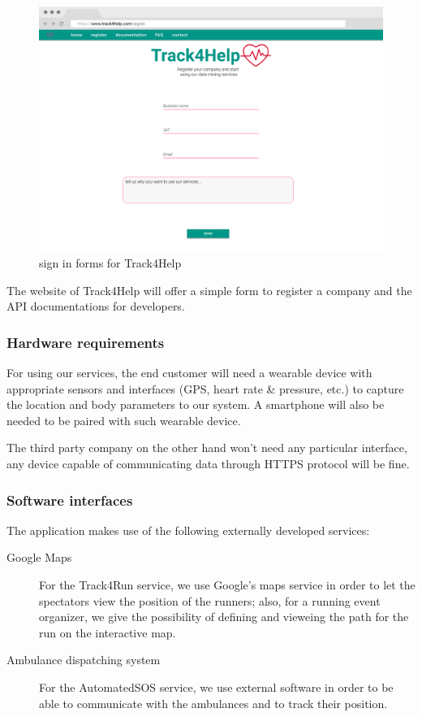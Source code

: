 \documentclass[../main.tex]{subfiles}
\begin{document}
\begin{figure}[H]
	\centering
	\includegraphics[scale=0.3]{images/mockup/webpage.png}
	\caption{sign in forms for Track4Help}
	\label{mockup_webpage}
\end{figure}
The website of Track4Help will offer a simple form to register a company and the API documentations for developers.

\subsubsection{Hardware requirements}

For using our services, the end customer will need a wearable device with appropriate sensors and interfaces (GPS, heart rate \& pressure, etc.) to capture the location and body parameters to our system. A smartphone will also be needed to be paired with such wearable device.

The third party company on the other hand won't need any particular interface, any device capable of communicating data through HTTPS protocol will be fine.

\subsubsection{Software interfaces}

The application makes use of the following externally developed services:

\begin{description}

	\item [Google Maps] For the Track4Run service, we use Google's maps service in order to let the spectators view the position of the runners; also, for a running event organizer, we give the possibility of defining and vieweing the path for the run on the interactive map.

	\item [Ambulance dispatching system] For the AutomatedSOS service, we use external software in order to be able to communicate with the ambulances and to track their position.

\end{description}
\end{document}
